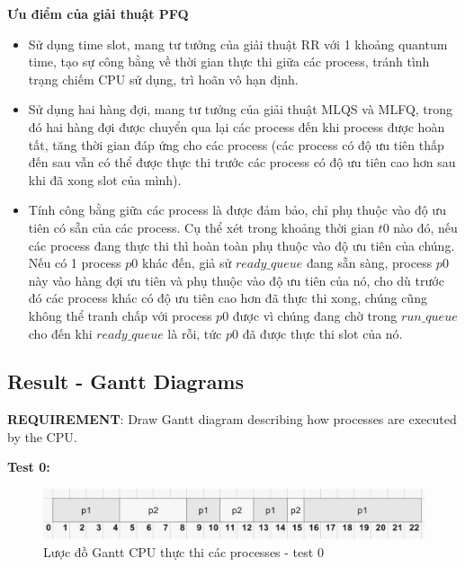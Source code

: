 \vspace{0.5cm}

\textbf{Ưu điểm của giải thuật PFQ}

\vspace{0.5cm}

\begin{itemize}
	\item Sử dụng time slot, mang tư tưởng của giải thuật RR với 1 khoảng quantum time, tạo sự công bằng về thời gian thực thi giữa các process, tránh tình trạng chiếm CPU sử dụng, trì hoãn vô hạn định.
	\item Sử dụng hai hàng đợi, mang tư tưởng của giải thuật MLQS và MLFQ, trong đó hai hàng đợi được chuyển qua lại các process đến khi process được hoàn tất, tăng thời gian đáp ứng cho các process (các process có độ ưu tiên thấp đến sau vẫn có thể được thực thi trước các process có độ ưu tiên cao hơn sau khi đã xong slot của mình).
	\item Tính công bằng giữa các process là được đảm bảo, chỉ phụ thuộc vào độ ưu tiên có sẵn của các process. Cụ thể xét trong khoảng thời gian $ t0 $ nào đó, nếu các process đang thực thi thì hoàn toàn phụ thuộc vào độ ưu tiên của chúng. Nếu có 1 process $ p0 $ khác đến, giả sử $ ready\_queue $ đang sẵn sàng, process $ p0 $ này vào hàng đợi ưu tiên và phụ thuộc vào độ ưu tiên của nó, cho dù trước đó các process khác có độ ưu tiên cao hơn đã thực thi xong, chúng cũng không thể tranh chấp với process $ p0 $ được vì chúng đang chờ trong  $ run\_queue $ cho đến khi $ ready\_queue $ là rỗi, tức $ p0 $ đã được thực thi slot của nó.
\end{itemize}

\vspace{0.5cm}

\subsection{Result - Gantt Diagrams}
\vspace{0.5cm}
\textbf{REQUIREMENT}: Draw Gantt diagram describing how processes are executed by the CPU.

\vspace{0.5cm}

\textbf{Test 0:}

\vspace{0.5cm}

\begin{figure}[tph]
	\centering
	\includegraphics[width=13cm]{Images/sched0.png}
	\vspace{0.5cm}
	\caption{Lược đồ Gantt CPU thực thi các processes - test 0}
	\label{fig:schedtest0}
\end{figure}


